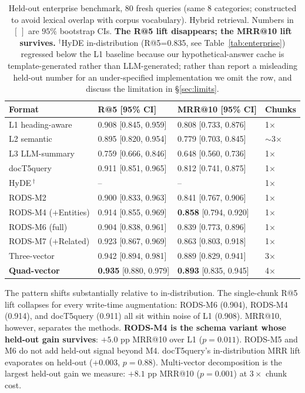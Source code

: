 \documentclass[11pt]{article}
\begin{document}
\begin{table}[t]
\centering
\caption{Held-out enterprise benchmark, 80 fresh queries (same 8
  categories; constructed to avoid lexical overlap with corpus
  vocabulary). Hybrid retrieval. Numbers in $[\,]$ are $95\%$
  bootstrap CIs. \textbf{The R@5 lift disappears; the MRR@10 lift
  survives.} $^{\dagger}$HyDE in-distribution
  (R@5=0.835, see Table~\ref{tab:enterprise}) regressed below the L1
  baseline because our hypothetical-answer cache is template-generated
  rather than LLM-generated; rather than report a misleading held-out
  number for an under-specified implementation we omit the row, and
  discuss the limitation in \S\ref{sec:limits}.}
\label{tab:heldout}
\small
\begin{tabular}{llll}
\toprule
\textbf{Format} & \textbf{R@5 [95\% CI]} & \textbf{MRR@10 [95\% CI]} & \textbf{Chunks} \\
\midrule
L1 heading-aware  & 0.908 [0.845, 0.959] & 0.808 [0.733, 0.876] & 1$\times$ \\
L2 semantic       & 0.895 [0.820, 0.954] & 0.779 [0.703, 0.845] & $\sim$3$\times$ \\
L3 LLM-summary    & 0.759 [0.666, 0.846] & 0.648 [0.560, 0.736] & 1$\times$ \\
docT5query        & 0.911 [0.851, 0.965] & 0.812 [0.741, 0.875] & 1$\times$ \\
HyDE\,$^{\dagger}$ & --                   & --                   & 1$\times$ \\
RODS-M2           & 0.900 [0.833, 0.963] & 0.841 [0.767, 0.906] & 1$\times$ \\
\rowcolor{bestcolor!12}
RODS-M4 ($+$Entities) & 0.914 [0.855, 0.969] & \textbf{0.858} [0.794, 0.920] & 1$\times$ \\
RODS-M6 (full)    & 0.904 [0.838, 0.961] & 0.839 [0.773, 0.896] & 1$\times$ \\
RODS-M7 ($+$Related) & 0.923 [0.867, 0.969] & 0.863 [0.803, 0.918] & 1$\times$ \\
\midrule
Three-vector      & 0.942 [0.894, 0.981] & 0.889 [0.829, 0.941] & 3$\times$ \\
\rowcolor{bestcolor!12}
\textbf{Quad-vector}      & \textbf{0.935} [0.880, 0.979] & \textbf{0.893} [0.835, 0.945] & 4$\times$ \\
\bottomrule
\end{tabular}
\end{table}

The pattern shifts substantially relative to in-distribution. The
single-chunk R@5 lift collapses for every write-time augmentation:
RODS-M6 (0.904), RODS-M4 (0.914), and docT5query (0.911) all sit
within noise of L1 (0.908). MRR@10, however, separates the methods.
\textbf{RODS-M4 is the schema variant whose held-out gain
survives}: $+5.0$ pp MRR@10 over L1 ($p{=}0.011$). RODS-M5 and M6
do not add held-out signal beyond M4. docT5query's in-distribution
MRR lift evaporates on held-out ($+0.003$, $p{=}0.88$). Multi-vector
decomposition is the largest held-out gain we measure: $+8.1$ pp
MRR@10 ($p{=}0.001$) at $3\times$ chunk cost.
\end{document}
